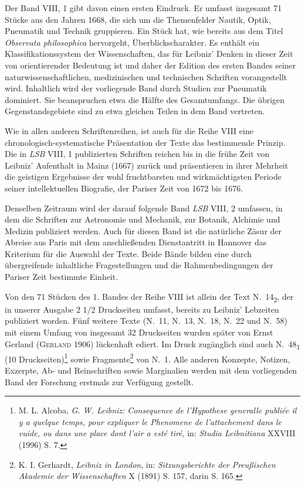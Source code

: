 Der Band VIII, 1 gibt davon einen ersten Eindruck. Er umfasst insge\-samt 71 St\"{u}cke aus den Jahren 1668, die sich um die Themenfelder Nautik, Optik, Pneumatik und Technik gruppieren. Ein St\"{u}ck hat, wie bereits aus dem Titel \textit{Observata philosophica} hervorgeht, \"{U}berblickscharakter. Es enth\"{a}lt ein Klassifikationssystem der Wissenschaften, das f\"{u}r Leibniz' Denken in dieser Zeit von orientierender Bedeutung ist und daher der Edition des ersten Bandes seiner naturwissenschaftlichen, medizinischen und technischen Schriften vorangestellt wird. Inhaltlich wird der vorliegende Band durch Studien zur Pneumatik dominiert. Sie beanspruchen etwa die H\"{a}lfte des Gesamtumfangs. Die \"{u}brigen Gegenstandsgebiete sind zu etwa gleichen Teilen in dem Band vertreten.\par
Wie in allen anderen Schriftenreihen, ist auch f\"{u}r die Reihe VIII eine chronologisch-systematische Pr\"{a}sentation der Texte das bestimmende Prinzip. Die in \textit{LSB} VIII, 1 publizierten Schriften reichen bis in die fr\"{u}he Zeit von Leibniz' Aufenthalt in Mainz (1667) zur\"{u}ck und pr\"{a}sentieren in ihrer Mehrheit die geistigen Ergebnisse der wohl fruchtbarsten und wirkm\"{a}chtigsten Periode seiner intellektuellen Biografie, der Pariser Zeit von 1672 bis 1676.\par
Denselben Zeitraum wird der darauf folgende Band \textit{LSB} VIII, 2 umfassen, in dem die Schriften zur Astronomie und Mechanik, zur Botanik, Alchimie und Medizin publiziert werden. Auch f\"{u}r diesen Band ist die nat\"{u}rliche Z\"{a}sur der Abreise aus Paris mit dem anschlie{\ss}enden Dienstantritt in Hannover das Kriterium f\"{u}r die Auswahl der Texte. Beide B\"{a}nde bilden eine durch \"{u}bergreifende inhaltliche Fragestellungen und die Rahmenbedingungen der Pariser Zeit bestimmte Einheit.\par
Von den 71 St\"{u}cken des 1. Bandes der Reihe VIII ist allein der Text N.~14\textsubscript{2}, der in unserer Ausgabe 2 1/2 Druckseiten umfasst, bereits zu Leibniz' Lebzeiten publiziert worden. F\"{u}nf weitere Texte (N.~11, N.~13, N.~18, N.~22 und N.~58) mit einem Umfang von insgesamt 32 Druckseiten wurden sp\"{a}ter von Ernst Gerland (\textsc{Gerland} 1906) l\"{u}ckenhaft ediert. Im Druck zug\"{a}nglich sind auch N.~48\textsubscript{1} (10 Druck\-seiten)\footnote{\footnotesize M. L. Alcoba, \textit{G. W. Leibniz: Consequence de l'Hypothese generalle publi\'{e}e il y a quelque temps, pour expliquer le Phenomene de l'attachement dans le vuide, ou dans une place dont l'air a est\'{e} tir\'{e}}, in: \textit{Studia Leibnitiana} XXVIII (1996) S. 7.} sowie Fragmente\footnote{\footnotesize K. I. Gerhardt, \textit{Leibniz in London}, in: \textit{Sitzungsberichte der Preu{\ss}ischen Akademie der Wissenschaften} X (1891) S. 157, darin S. 165.} von N.~1. Alle anderen Konzepte, Notizen, Exzerpte, Ab- und Reinschriften sowie Marginalien werden mit dem vorliegenden Band der Forschung erstmals zur Verf\"{u}gung gestellt.\par
